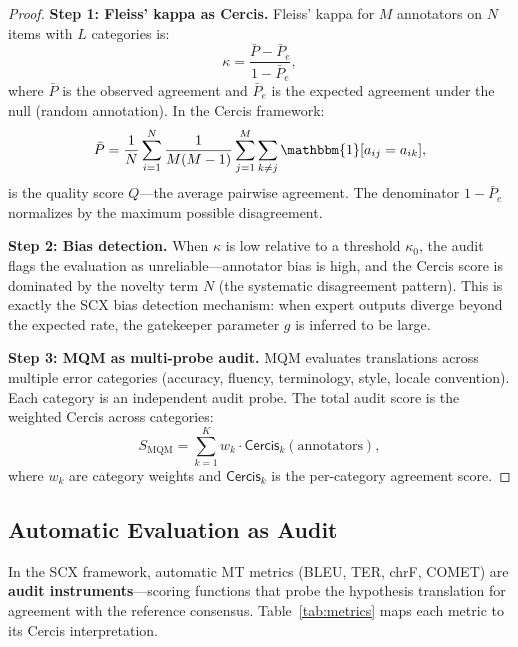 \documentclass[12pt,a4paper]{article}
\theoremstyle{remark}
\newcommand{\SCX}{\textsf{SCX}}
\newcommand{\Cercis}{\textsf{Cercis}}
\begin{document}
\begin{proof}
\noindent\textbf{Step 1: Fleiss' kappa as Cercis.}
Fleiss' kappa for $M$ annotators on $N$ items with $L$ categories is:
\begin{equation}
  \kappa = \frac{\bar{P} - \bar{P}_e}{1 - \bar{P}_e},
\end{equation}
where $\bar{P}$ is the observed agreement and $\bar{P}_e$ is the
expected agreement under the null (random annotation). In the
\Cercis{} framework:
\begin{equation}
  \bar{P} = \frac{1}{N} \sum_{i=1}^N \frac{1}{M(M-1)} \sum_{j=1}^M
    \sum_{k \neq j} \mathbbm{1}[a_{ij} = a_{ik}],
\end{equation}
is the quality score $Q$---the average pairwise agreement. The
denominator $1 - \bar{P}_e$ normalizes by the maximum possible
disagreement.

\smallskip
\noindent\textbf{Step 2: Bias detection.}
When $\kappa$ is low relative to a threshold $\kappa_0$, the audit
flags the evaluation as unreliable---annotator bias is high, and
the \Cercis{} score is dominated by the novelty term $N$ (the
systematic disagreement pattern). This is exactly the \SCX{} bias
detection mechanism: when expert outputs diverge beyond the expected
rate, the gatekeeper parameter $g$ is inferred to be large.

\smallskip
\noindent\textbf{Step 3: MQM as multi-probe audit.}
MQM evaluates translations across multiple error categories
(accuracy, fluency, terminology, style, locale convention).
Each category is an independent audit probe. The total audit
score is the weighted \Cercis{} across categories:
\begin{equation}
  S_{\text{MQM}} = \sum_{k=1}^K w_k \cdot \Cercis_k(\text{annotators}),
\end{equation}
where $w_k$ are category weights and $\Cercis_k$ is the per-category
agreement score.
\end{proof}

\subsection{Automatic Evaluation as Audit}

In the \SCX{} framework, automatic MT metrics (BLEU, TER, chrF,
COMET) are \textbf{audit instruments}---scoring functions that
probe the hypothesis translation for agreement with the reference
consensus. Table~\ref{tab:metrics} maps each metric to its \Cercis{}
interpretation.
\end{document}
